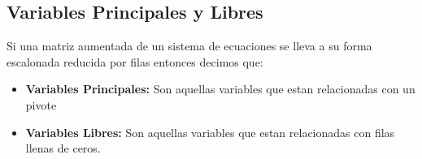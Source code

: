 \documentclass[12pt, fleqn]{report}                             %
\theoremstyle{break}                                            %
\begin{document}
            
            \clearpage
            \subsection{Variables Principales y Libres}

                Si una matriz aumentada de un sistema de ecuaciones
                se lleva a su forma escalonada reducida por filas
                entonces decimos que:

                \begin{itemize}
                    \item \textbf{Variables Principales:}
                        Son aquellas variables que estan relacionadas
                        con un pivote
                    \item \textbf{Variables Libres:}
                        Son aquellas variables que estan relacionadas
                        con filas llenas de ceros.
                \end{itemize}
\end{document}
